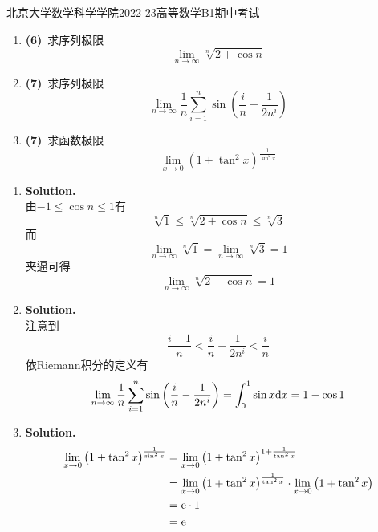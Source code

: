 \documentclass{ctexart}
\begin{document}
\pagestyle{empty}
\begin{center}\Large
    北京大学数学科学学院2022-23高等数学B1期中考试
\end{center}
\begin{problem}[1.(20\songti{分})]
    \begin{enumerate}[label=\textbf{(\arabic*)},leftmargin=*]
        \item \textbf{(6)}\ 求序列极限$$\lim_{n\to\infty}{\sqrt[n]{2+\cos n}}$$
        \item \textbf{(7)}\ 求序列极限$$\lim_{n\to\infty}{\dfrac{1}{n}\sum_{i=1}^{n}{\sin\left(\dfrac{i}{n}-\dfrac{1}{2n^i}\right)}}$$
        \item \textbf{(7)}\ 求函数极限$$\lim_{x\to0}{\left(1+\tan^2 x\right)^{\frac{1}{\sin^2 x}}}$$
    \end{enumerate}
\end{problem}
\begin{solution}[Solution.]
    \begin{enumerate}[label=\textbf{(\arabic*)},leftmargin=*]
        \item \textbf{Solution.}\\
            由$-1\leqslant \cos n\leqslant 1$有
            $$\sqrt[n]{1}\leqslant\sqrt[n]{2+\cos n}\leqslant\sqrt[n]{3}$$
            而$$\lim_{n\to\infty}{\sqrt[n]{1}}=\lim_{n\to\infty}{\sqrt[n]{3}}=1$$
            夹逼可得$$\lim_{n\to\infty}{\sqrt[n]{2+\cos n}}=1$$
        \item \textbf{Solution.}\\
            注意到$$\dfrac{i-1}{n}<\dfrac{i}{n}-\dfrac{1}{2n^i}<\dfrac{i}{n}$$
            依Riemann积分的定义有
            $$\lim_{n\to\infty}{\dfrac{1}{n}\sum_{i=1}^{n}{\sin\left(\dfrac{i}{n}-\dfrac{1}{2n^i}\right)}}=\int_0^1{\sin x\mathrm{d} x}=1-\cos1$$
        \item \textbf{Solution.}
            \begin{align*}
                \lim_{x\to0}{\left(1+\tan^2 x\right)^{\frac{1}{\sin^2 x}}}
                &= \lim_{x\to0}{\left(1+\tan^2 x\right)^{1+\frac{1}{\tan^2 x}}} \\
                &= \lim_{x\to0}{\left(1+\tan^2 x\right)^{\frac{1}{\tan^2 x}}}\cdot\lim_{x\to0}{\left(1+\tan^2 x\right)} \\
                &= \mathrm{e}\cdot 1 \\
                &= \mathrm{e}
            \end{align*}
    \end{enumerate}
\end{solution}
\end{document}
